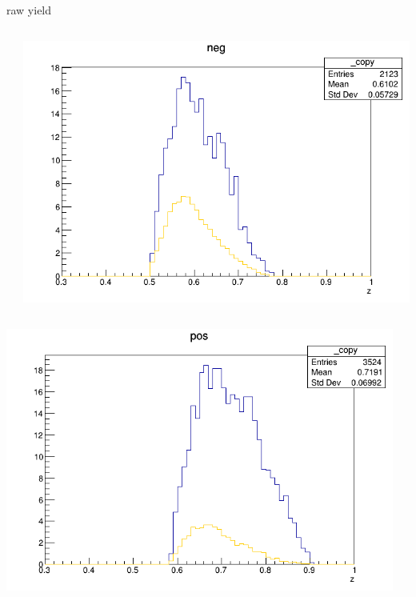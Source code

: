 \begin{frame}{raw yield}
\begin{columns}
\begin{column}[T]{0.25\textwidth}
\end{column}
\begin{column}[T]{0.25\textwidth}
\includegraphics[width = \textwidth]{results/yield/statistics/yield_x_Q2_z_0.40_4.000_0.60_neg.png}
\end{column}
\end{columns}
\begin{columns}
\begin{column}[T]{0.25\textwidth}
\includegraphics[width = \textwidth]{results/yield/statistics/yield_x_Q2_z_0.40_4.000_0.70_pos.png}
\end{column}
\begin{column}[T]{0.25\textwidth}

\end{column}
\end{columns}
\end{frame}
